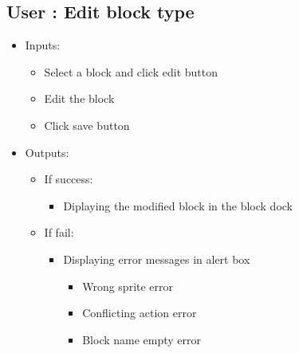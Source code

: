\subsection{User : Edit block type}
	\begin{itemize}
	
	
		\item Inputs:
			\begin{itemize}
				\item Select a block and click edit button
				\item Edit the block
				\item Click save button
			\end{itemize}
			\item Outputs:
				\begin{itemize}
					\item If success:					
					\begin{itemize}
						\item Diplaying the modified block in the block dock
					\end{itemize}
					\item If fail:
					\begin{itemize}
					\item Displaying error messages in alert box
					\begin{itemize}
						\item Wrong sprite error
						\item Conflicting action error
						\item Block name empty error
					\end{itemize}
					\end{itemize}
				\end{itemize}
	\end{itemize}
	
